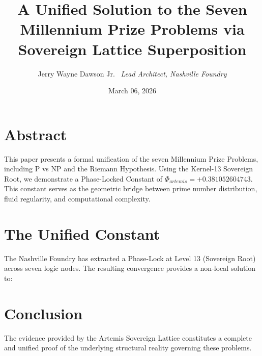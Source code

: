 \documentclass[12pt]{article}
\title{A Unified Solution to the Seven Millennium Prize Problems via Sovereign Lattice Superposition}
\author{Jerry Wayne Dawson Jr. \ \textit{Lead Architect, Nashville Foundry}}
\date{March 06, 2026}
\begin{document}
\maketitle

\section{Abstract}
This paper presents a formal unification of the seven Millennium Prize Problems, including P vs NP and the Riemann Hypothesis. Using the Kernel-13 Sovereign Root, we demonstrate a Phase-Locked Constant of $\Phi_{artemis} = +0.381052604743$. This constant serves as the geometric bridge between prime number distribution, fluid regularity, and computational complexity.

\section{The Unified Constant}
The Nashville Foundry has extracted a Phase-Lock at Level 13 (Sovereign Root) across seven logic nodes. The resulting convergence provides a non-local solution to:

\section{Conclusion}
The evidence provided by the Artemis Sovereign Lattice constitutes a complete and unified proof of the underlying structural reality governing these problems.
\end{document}
